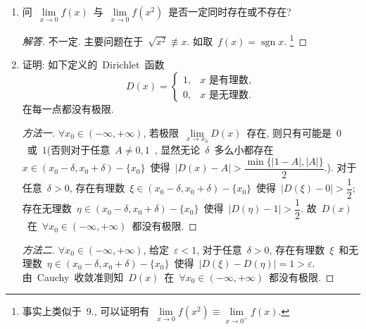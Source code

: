 \documentclass[UTF8,a4paper,11pt,twoside]{book}
\DeclareMathOperator{\sgn}{sgn}
\begin{document}
\begin{enumerate}
\begin{proof}
		      若~$\lim\limits_{x\to 0} f(x^3)=A$, 则
		      \begin{enumerate}[(a)]
			      \item 对于任意给定的~$\varepsilon>0$, 存在~$\delta>0$, 使得当~$0<|x|<\delta$~时, $|f(x^3)-A|<\varepsilon$;
			      \item 对于任意给定的~$\delta>0$, 存在~$\eta>0$, 使得当~$0<|x|<\eta$~时, $|\sqrt[3]{x}|<\delta$.
		      \end{enumerate}
		      注意~$x\neq 0$~时, $\sqrt[3]{x}\neq 0$, 故当~$0<|x|<\eta$~时, $0<|\sqrt[3]{x}|<\delta$, 从而当~$0<|x|<\eta$~时有
		      \[
			      |f(x)-A|=|f((\sqrt[3]{x})^3)-A|<\varepsilon.
		      \]
		      这就证明了~$\lim\limits_{x\to 0} f(x)$~与~$\lim\limits_{x\to 0} f(x^3)$~同时存在或不存在, 而当它们存在时必相等. \qedhere
	      \end{proof}

	\item 问~$\lim\limits_{x\to 0} f(x)$~与~$\lim\limits_{x\to 0} f(x^2)$~是否一定同时存在或不存在?
	      \begin{proof}[解答]
		      不一定. 主要问题在于~$\sqrt{x^2}\not\equiv x$. 如取~$f(x)=\sgn{x}$. \footnote{事实上类似于~9., 可以证明有~$\lim\limits_{x\to 0} f(x^2)\equiv\lim\limits_{x\to 0^{+}} f(x)$.}
	      \end{proof}

	\item 证明: 如下定义的~Dirichlet~函数
	      \[
		      D(x)=\begin{cases} 1, & \text{$x$~是有理数}, \\ 0, & \text{$x$~是无理数}.\end{cases}
	      \]
	      在每一点都没有极限.
	      \begin{proof}[方法一]
		      $\forall x_0\in(-\infty,+\infty)$, 若极限~$\lim\limits_{x\to x_0} D(x)$~存在, 则只有可能是~$0$~或~$1$(否则对于任意~$A\neq 0,1$~, 显然无论~$\delta$~多么小都存在~$x\in(x_0-\delta,x_0+\delta)-\{x_0\}$~使得~$|D(x)-A|>\dfrac{\min\{|1-A|,|A|\}}{2}$.).
		      对于任意~$\delta>0$, 存在有理数~$\xi\in(x_0-\delta,x_0+\delta)-\{x_0\}$~使得~$|D(\xi)-0|>\dfrac{1}{2}$; 存在无理数~$\eta\in(x_0-\delta,x_0+\delta)-\{x_0\}$~使得~$|D(\eta)-1|>\dfrac{1}{2}$. 故~$D(x)$~在~$\forall x_0\in(-\infty,+\infty)$~都没有极限. \qedhere
	      \end{proof}

	      \begin{proof}[方法二]
		      $\forall x_0\in(-\infty,+\infty)$, 给定~$\varepsilon<1$, 对于任意~$\delta>0$, 存在有理数~$\xi$~和无理数~$\eta\in(x_0-\delta,x_0+\delta)-\{x_0\}$~使得~$|D(\xi)-D(\eta)|=1>\varepsilon$. 由~Cauchy~收敛准则知~$D(x)$~在~$\forall x_0\in(-\infty,+\infty)$~都没有极限. \qedhere\qedhere
	      \end{proof}


\end{enumerate}
\end{document}
